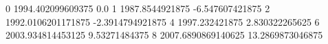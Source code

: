 0 1994.402099609375 0.0
1 1987.8544921875 -6.547607421875
2 1992.0106201171875 -2.3914794921875
4 1997.232421875 2.830322265625
6 2003.934814453125 9.53271484375
8 2007.6890869140625 13.2869873046875
